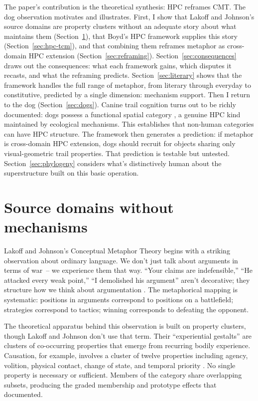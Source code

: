 \documentclass[12pt]{article}
\begin{document}
The paper's contribution is the theoretical synthesis: HPC reframes CMT. The dog observation motivates and illustrates. First, I show that Lakoff and Johnson's source domains are property clusters without an adequate story about what maintains them (Section~\ref{sec:source-domains}), that Boyd's HPC framework supplies this story (Section~\ref{sec:hpc-tcm}), and that combining them reframes metaphor as cross-domain HPC extension (Section~\ref{sec:reframing}). Section~\ref{sec:consequences} draws out the consequences: what each framework gains, which disputes it recasts, and what the reframing predicts. Section~\ref{sec:literary} shows that the framework handles the full range of metaphor, from literary through everyday to constitutive, predicted by a single dimension: mechanism support. Then I return to the dog (Section~\ref{sec:dogs}). Canine trail cognition turns out to be richly documented: dogs possess a functional spatial category , a genuine HPC kind maintained by ecological mechanisms. This establishes that non-human categories can have HPC structure. The framework then generates a prediction: if metaphor is cross-domain HPC extension, dogs should recruit  for objects sharing only visual-geometric trail properties. That prediction is testable but untested. Section~\ref{sec:phylogeny} considers what's distinctively human about the superstructure built on this basic operation.

\section{Source domains without mechanisms}
\label{sec:source-domains}

Lakoff and Johnson's Conceptual Metaphor Theory begins with a striking observation about ordinary language. We don't just talk about arguments in terms of war~-- we experience them that way. \enquote{Your claims are indefensible,} \enquote{He attacked every weak point,} \enquote{I demolished his argument} aren't decorative; they structure how we think about argumentation \citep[4]{lakoff1980}. The metaphorical mapping is systematic: positions in arguments correspond to positions on a battlefield; strategies correspond to tactics; winning corresponds to defeating the opponent.

The theoretical apparatus behind this observation is built on property clusters, though Lakoff and Johnson don't use that term. Their \enquote{experiential gestalts} are clusters of co-occurring properties that emerge from recurring bodily experience. Causation, for example, involves a cluster of twelve properties including agency, volition, physical contact, change of state, and temporal priority \citep[69--72]{lakoff1980}. No single property is necessary or sufficient. Members of the category  share overlapping subsets, producing the graded membership and prototype effects that \textcite{rosch1975} documented.
\end{document}
